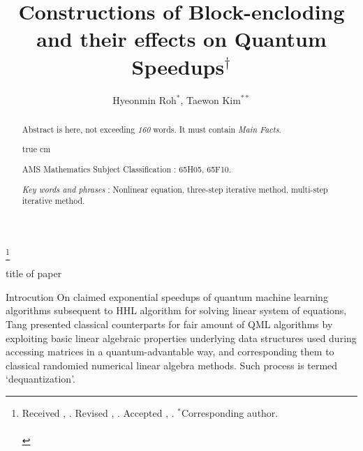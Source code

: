 \documentclass[10pt,twoside,reqno]{amsart} %
\makeatletter
\renewcommand{\section}{\@startsection{section}{1}
   \z@{.7\linespacing\@plus\linespacing}{.5\linespacing}
   {\normalfont\upshape\bfseries\centering}}
\theoremstyle{plain}
\theoremstyle{definition}
\makeatother
\begin{document}
\vspace{-0.15cm}



\vspace{1.3cm}

\title
{ %
Constructions of Block-encloding and their effects on Quantum Speedups$^\dagger$  
}

\author
{ %
  Hyeonmin Roh$^*$, Taewon Kim$^{**}$ 
}

\thanks{ {\scriptsize  Received     ,     .  Revised ,   .    Accepted     ,   . \enskip $^*$Corresponding author.}\\
\\
}


\maketitle


\begin{abstract}
Abstract is here, not exceeding {\it 160} words. It must contain {\it Main Facts}.

 true cm


\noindent
 AMS Mathematics Subject Classification : 65H05, 65F10.

\noindent 
{\it Key words and phrases } : %
Nonlinear equation, three-step iterative method, multi-step iterative method.

\end{abstract}


\pagestyle{myheadings}
         {\centerline {\scriptsize  title of paper  }}


\bigskip
\section{Introcution}
On claimed exponential speedups of quantum machine learning algorithms
subsequent to HHL algorithm for solving linear system of equations,
Tang presented classical counterparts for fair amount of QML algorithms
by exploiting basic linear algebraic properties underlying data structures 
used during accessing matrices in a quantum-advantable way, and corresponding
them to classical randomied numerical linear algebra methods. Such process is
termed `dequantization'. 
\end{document}
